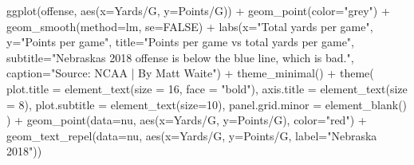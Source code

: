 \documentclass[
  letterpaper,
  DIV=11,
  numbers=noendperiod]{scrreprt}
\newenvironment{Shaded}{\begin{snugshade}}{\end{snugshade}}
\newcommand{\AttributeTok}[1]{\textcolor[rgb]{0.40,0.45,0.13}{#1}}
\newcommand{\ConstantTok}[1]{\textcolor[rgb]{0.56,0.35,0.01}{#1}}
\newcommand{\DecValTok}[1]{\textcolor[rgb]{0.68,0.00,0.00}{#1}}
\newcommand{\FunctionTok}[1]{\textcolor[rgb]{0.28,0.35,0.67}{#1}}
\newcommand{\NormalTok}[1]{\textcolor[rgb]{0.00,0.23,0.31}{#1}}
\newcommand{\SpecialCharTok}[1]{\textcolor[rgb]{0.37,0.37,0.37}{#1}}
\newcommand{\StringTok}[1]{\textcolor[rgb]{0.13,0.47,0.30}{#1}}
\begin{document}
\begin{Shaded}
\begin{Highlighting}[]
\FunctionTok{ggplot}\NormalTok{(offense, }\FunctionTok{aes}\NormalTok{(}\AttributeTok{x=}\StringTok{\textasciigrave{}}\AttributeTok{Yards/G}\StringTok{\textasciigrave{}}\NormalTok{, }\AttributeTok{y=}\StringTok{\textasciigrave{}}\AttributeTok{Points/G}\StringTok{\textasciigrave{}}\NormalTok{)) }\SpecialCharTok{+} 
  \FunctionTok{geom\_point}\NormalTok{(}\AttributeTok{color=}\StringTok{"grey"}\NormalTok{) }\SpecialCharTok{+} \FunctionTok{geom\_smooth}\NormalTok{(}\AttributeTok{method=}\NormalTok{lm, }\AttributeTok{se=}\ConstantTok{FALSE}\NormalTok{) }\SpecialCharTok{+} 
  \FunctionTok{labs}\NormalTok{(}\AttributeTok{x=}\StringTok{"Total yards per game"}\NormalTok{, }\AttributeTok{y=}\StringTok{"Points per game"}\NormalTok{, }\AttributeTok{title=}\StringTok{"Points per game vs total yards per game"}\NormalTok{, }\AttributeTok{subtitle=}\StringTok{"Nebraska\textquotesingle{}s 2018 offense is below the blue line, which is bad."}\NormalTok{, }\AttributeTok{caption=}\StringTok{"Source: NCAA | By Matt Waite"}\NormalTok{) }\SpecialCharTok{+} 
  \FunctionTok{theme\_minimal}\NormalTok{() }\SpecialCharTok{+} 
  \FunctionTok{theme}\NormalTok{(}
    \AttributeTok{plot.title =} \FunctionTok{element\_text}\NormalTok{(}\AttributeTok{size =} \DecValTok{16}\NormalTok{, }\AttributeTok{face =} \StringTok{"bold"}\NormalTok{),}
    \AttributeTok{axis.title =} \FunctionTok{element\_text}\NormalTok{(}\AttributeTok{size =} \DecValTok{8}\NormalTok{), }
    \AttributeTok{plot.subtitle =} \FunctionTok{element\_text}\NormalTok{(}\AttributeTok{size=}\DecValTok{10}\NormalTok{), }
    \AttributeTok{panel.grid.minor =} \FunctionTok{element\_blank}\NormalTok{()}
\NormalTok{    ) }\SpecialCharTok{+}
  \FunctionTok{geom\_point}\NormalTok{(}\AttributeTok{data=}\NormalTok{nu, }\FunctionTok{aes}\NormalTok{(}\AttributeTok{x=}\StringTok{\textasciigrave{}}\AttributeTok{Yards/G}\StringTok{\textasciigrave{}}\NormalTok{, }\AttributeTok{y=}\StringTok{\textasciigrave{}}\AttributeTok{Points/G}\StringTok{\textasciigrave{}}\NormalTok{), }\AttributeTok{color=}\StringTok{"red"}\NormalTok{) }\SpecialCharTok{+} 
  \FunctionTok{geom\_text\_repel}\NormalTok{(}\AttributeTok{data=}\NormalTok{nu, }\FunctionTok{aes}\NormalTok{(}\AttributeTok{x=}\StringTok{\textasciigrave{}}\AttributeTok{Yards/G}\StringTok{\textasciigrave{}}\NormalTok{, }\AttributeTok{y=}\StringTok{\textasciigrave{}}\AttributeTok{Points/G}\StringTok{\textasciigrave{}}\NormalTok{, }\AttributeTok{label=}\StringTok{"Nebraska 2018"}\NormalTok{))}
\end{Highlighting}
\end{Shaded}
\end{document}
